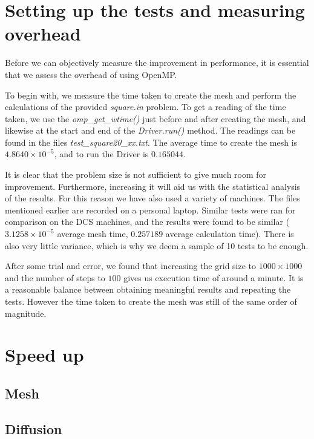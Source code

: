 \documentclass[11pt,journal]{IEEEtran}
\begin{document}
	\section{Setting up the tests and measuring overhead}
	Before we can objectively measure the improvement in performance, it is essential that we assess the overhead of using OpenMP. 
	
	To begin with, we measure the time taken to create the mesh and perform the calculations of the provided \emph{square.in} problem. To get a reading of the time taken, we use the \emph{omp\_get\_wtime()} just before and after creating the mesh, and likewise at the start and end of the \emph{Driver.run()} method. The readings can be found in the files \emph{test\_square20\_xx.txt}. The average time to create the mesh is $4.8640 \times 10^{-5}$, and to run the Driver is $0.165044$.
	
	It is clear that the problem size is not sufficient to give much room for improvement. Furthermore, increasing it will aid us with the statistical analysis of the results. For this reason we have also used a variety of machines. The files mentioned earlier are recorded on a personal laptop. Similar tests were ran for comparison on the DCS machines, and the results were found to be similar ($3.1258 \times 10^{-5}$ average mesh time, $0.257189$ average calculation time). There is also very little variance, which is why we deem a sample of 10 tests to be enough.
	
	After some trial and error, we found that increasing the grid size to $1000 \times 1000$ and the number of steps to $100$ gives us execution time of around a minute. It is a reasonable balance between obtaining meaningful results and repeating the tests. However the time taken to create the mesh was still of the same order of magnitude.
	
	
	
	\section{Speed up}
	
	\subsection{Mesh}
	
	\subsection{Diffusion}
	
\end{document}
